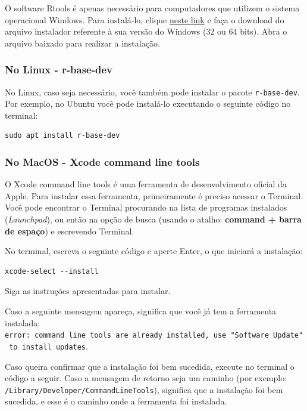 \documentclass[
]{book}
\begin{document}
O software Rtools é apenas necessário para computadores que utilizem o sistema operacional Windows. Para instalá-lo, clique \href{https://cran.r-project.org/bin/windows/Rtools/}{neste link} e faça o download do arquivo instalador referente à sua versão do Windows (32 ou 64 bits). Abra o arquivo baixado para realizar a instalação.

\hypertarget{no-linux---r-base-dev}{%
\subsubsection{No Linux - r-base-dev}\label{no-linux---r-base-dev}}

No Linux, caso seja necessário, você também pode instalar o pacote \texttt{r-base-dev}. Por exemplo, no Ubuntu você pode instalá-lo executando o seguinte código no terminal:

\begin{verbatim}
sudo apt install r-base-dev
\end{verbatim}

\hypertarget{no-macos---xcode-command-line-tools}{%
\subsubsection{No MacOS - Xcode command line tools}\label{no-macos---xcode-command-line-tools}}

O Xcode command line tools é uma ferramenta de desenvolvimento oficial da Apple. Para instalar essa ferramenta, primeiramente é preciso acessar o Terminal. Você pode encontrar o Terminal procurando na lista de programas instalados (\emph{Launchpad}), ou então na opção de busca (usando o atalho: \textbf{command + barra de espaço}) e escrevendo Terminal.

No terminal, escreva o seguinte código e aperte Enter, o que iniciará a instalação:

\begin{verbatim}
xcode-select --install
\end{verbatim}

Siga as instruções apresentadas para instalar.

Caso a seguinte mensagem apareça, significa que você já tem a ferramenta instalada: \texttt{error:\ command\ line\ tools\ are\ already\ installed,\ use\ "Software\ Update"\ to\ install\ updates}.

Caso queira confirmar que a instalação foi bem sucedida, execute no terminal o código a seguir. Caso a mensagem de retorno seja um caminho (por exemplo: \texttt{/Library/Developer/CommandLineTools}), significa que a instalação foi bem sucedida, e esse é o caminho onde a ferramenta foi instalada.
\end{document}
